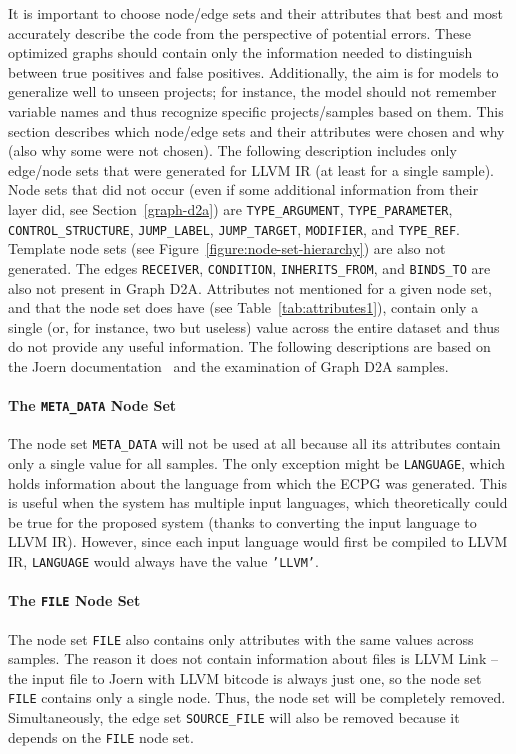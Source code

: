 It is important to choose node/edge sets and their attributes that best and most accurately describe the code from the perspective of potential errors. These optimized graphs should contain only the information needed to distinguish between true positives and false positives. Additionally, the aim is for models to generalize well to unseen projects; for instance, the model should not remember variable names and thus recognize specific projects/samples based on them. This section describes which node/edge sets and their attributes were chosen and why (also why some were not chosen). The following description includes only edge/node sets that were generated for LLVM IR (at least for a single sample). Node sets that did not occur (even if some additional information from their layer did, see Section~\ref{graph-d2a}) are \texttt{TYPE\_ARGUMENT}, \texttt{TYPE\_PARAMETER}, \texttt{CONTROL\_STRUCTURE}, \texttt{JUMP\_LABEL}, \texttt{JUMP\_TARGET}, \texttt{MODIFIER}, and \texttt{TYPE\_REF}. Template node sets (see Figure~\ref{figure:node-set-hierarchy}) are also not generated. The edges \texttt{RECEIVER}, \texttt{CONDITION}, \texttt{INHERITS\_FROM}, and \texttt{BINDS\_TO} are also not present in Graph D2A. Attributes not mentioned for a given node set, and that the node set does have (see Table~\ref{tab:attributes1}), contain only a single (or, for instance, two but useless) value across the entire dataset and thus do not provide any useful information. The following descriptions are based on the Joern documentation~\cite{joern-cpg-doc} and the examination of Graph D2A samples.

\paragraph{The \texttt{META\_DATA} Node Set}
The node set \texttt{META\_DATA} will not be used at all because all its attributes contain only a single value for all samples. The only exception might be \texttt{LANGUAGE}, which holds information about the language from which the ECPG was generated. This is useful when the system has multiple input languages, which theoretically could be true for the proposed system (thanks to converting the input language to LLVM IR). However, since each input language would first be compiled to LLVM IR, \texttt{LANGUAGE} would always have the value \texttt{'LLVM'}.

\paragraph{The \texttt{FILE} Node Set}
The node set \texttt{FILE} also contains only attributes with the same values across samples. The reason it does not contain information about files is LLVM Link -- the input file to Joern with LLVM bitcode is always just one, so the node set \texttt{FILE} contains only a single node. Thus, the node set will be completely removed. Simultaneously, the edge set \texttt{SOURCE\_FILE} will also be removed because it depends on the \texttt{FILE} node set.

